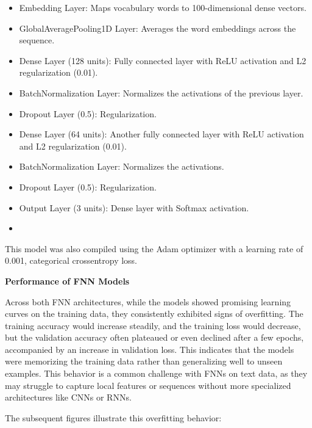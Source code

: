 \begin{itemize}
    \item Embedding Layer: Maps vocabulary words to 100-dimensional dense vectors.
    \item GlobalAveragePooling1D Layer: Averages the word embeddings across the sequence.
    \item Dense Layer (128 units): Fully connected layer with ReLU activation and L2 regularization (0.01).
    \item BatchNormalization Layer: Normalizes the activations of the previous layer.
    \item Dropout Layer (0.5): Regularization.
    \item Dense Layer (64 units): Another fully connected layer with ReLU activation and L2 regularization (0.01).
    \item BatchNormalization Layer: Normalizes the activations.
    \item Dropout Layer (0.5): Regularization.
    \item Output Layer (3 units): Dense layer with Softmax activation.
    \item 
\end{itemize}
This model was also compiled using the Adam optimizer with a learning rate of 0.001, categorical crossentropy loss.

\textbf{Performance of FNN Models
}

Across both FNN architectures, while the models showed promising learning curves on the training data, they consistently exhibited signs of overfitting. The training accuracy would increase steadily, and the training loss would decrease, but the validation accuracy often plateaued or even declined after a few epochs, accompanied by an increase in validation loss. This indicates that the models were memorizing the training data rather than generalizing well to unseen examples. This behavior is a common challenge with FNNs on text data, as they may struggle to capture local features or sequences without more specialized architectures like CNNs or RNNs.

The subsequent figures illustrate this overfitting behavior:

